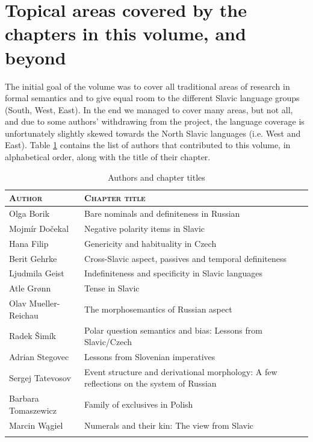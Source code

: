 \documentclass[output=paper,colorlinks,citecolor=brown]{langscibook}
\begin{document}
\section{Topical areas covered by the chapters in this volume, and beyond}

The initial goal of the volume was to cover all traditional areas of research in formal semantics and to give equal room to the different Slavic language groups (South, West, East). In the end we managed to cover many areas, but not all, and due to some authors' withdrawing from the project, the language coverage is unfortunately slightly skewed towards the North Slavic languages (i.e. West and East). Table \ref{tab:GS:authors} contains the list of authors that contributed to this volume, in alphabetical order, along with the title of their chapter.

\begin{table}
    \centering
    \begin{tabularx}{\textwidth}{lX}
    \lsptoprule
         \textsc{Author}&\textsc{Chapter title} \\\midrule
         Olga Borik &Bare nominals and definiteness in Russian\smallskip
         \\
         Mojmír Dočekal&Negative polarity items in Slavic\smallskip
         \\
         Hana Filip&Genericity and habituality in Czech\smallskip
         \\
         Berit Gehrke &Cross-Slavic aspect, passives and temporal definiteness\smallskip\\
         Ljudmila Geist&Indefiniteness and specificity in Slavic languages\smallskip\\
         Atle Grønn&Tense in Slavic\smallskip
         \\
         Olav Mueller-Reichau&The morphosemantics of Russian aspect\smallskip
         \\
         Radek Šimík &Polar question semantics and bias:
          Lessons from Slavic/Czech\smallskip
         \\
        Adrian Stegovec&Lessons from Slovenian imperatives\smallskip
         \\
         Sergej Tatevosov&Event structure and derivational morphology:
         A few reflections on the system of Russian\smallskip
         \\
         Barbara Tomaszewicz&Family of exclusives in Polish\smallskip
         \\
         Marcin Wągiel&Numerals and their kin: The view from Slavic 
         \\
    \lspbottomrule     
    \end{tabularx}
    \caption{Authors and chapter titles}
    \label{tab:GS:authors}
\end{table}
\end{document}
